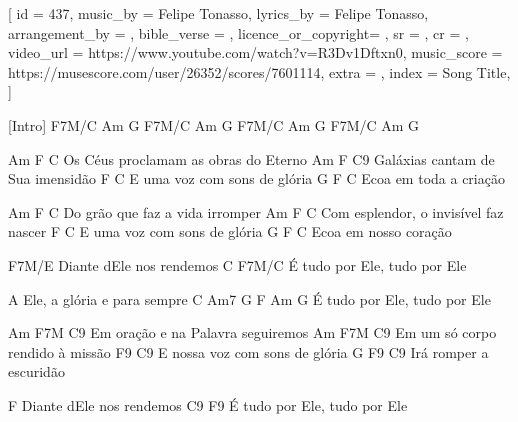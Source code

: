 [
    id                  = {437},
    music_by            = {Felipe Tonasso}, %
    lyrics_by           = {Felipe Tonasso}, %
    arrangement_by      = {}, %
    bible_verse         = {},
    licence_or_copyright= {},
    sr                  = {},
    cr                  = {},
    video_url           = {https://www.youtube.com/watch?v=R3Dv1Dftxn0}, %
    music_score         = {https://musescore.com/user/26352/scores/7601114},
    extra               = {},
    index               = {Song Title},
]

\beginverse

[Intro] F7M/C  Am  G
        F7M/C  Am  G
        F7M/C  Am  G
        F7M/C  Am  G

             Am        F             C 
  Os Céus proclamam as obras do Eterno
           Am        F            C9
  Galáxias cantam de Sua imensidão
        F                C
  E uma voz com sons de glória
          G      F  C
  Ecoa em toda a criação

\endverse

\beginverse
              Am    F            C
  Do grão que faz a vida irromper
            Am         F               C
  Com esplendor, o invisível faz nascer
      F                 C
  E uma voz com sons de glória
          G     F  C
  Ecoa em nosso coração         
\endverse

\beginverse
F7M/E
  Diante dEle nos rendemos
    C                        F7M/C 
  É tudo por Ele, tudo por Ele

  A Ele, a glória e para sempre
    C             Am7      G   F  Am  G
  É tudo por Ele, tudo por Ele
\endverse

\beginverse
        Am         F7M            C9
  Em oração e na Palavra seguiremos
           Am       F7M         C9
  Em um só corpo rendido à missão
           F9               C9
  E nossa voz com sons de glória
          G    F9    C9 
  Irá romper a escuridão

\endverse

\beginverse
F
  Diante dEle nos rendemos
    C9                       F9 
  É tudo por Ele, tudo por Ele

